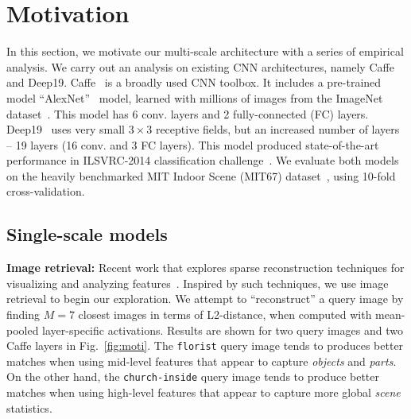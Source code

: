 \documentclass[10pt,twocolumn,letterpaper]{article}
\begin{document}


\section{Motivation\label{sec:motivation}}

In this section, we motivate our multi-scale architecture with a series of empirical analysis. We carry out an analysis on existing CNN architectures, namely Caffe and Deep19. Caffe~\cite{Caffe} is a broadly used CNN toolbox. It includes a pre-trained model ``AlexNet''~\cite{AlexNet} model, learned with millions of images from the ImageNet dataset~\cite{ImageNet}. This model has 6 conv. layers and 2 fully-connected (FC) layers. Deep19~\cite{veryDeep} uses very small $3\times 3$ receptive fields, but an increased number of layers -- 19 layers (16 conv. and 3 FC layers). This model produced state-of-the-art performance in ILSVRC-2014 classification challenge~\cite{ILSVRC14}. We evaluate both models on the heavily benchmarked MIT Indoor Scene (MIT67) dataset~\cite{MIT67}, using 10-fold cross-validation.

\subsection{Single-scale models} 

{\bf Image retrieval:} Recent work that explores sparse reconstruction techniques for visualizing and analyzing features~\cite{vondrick2013hoggles}. Inspired by such techniques, we use image retrieval to begin our exploration. We attempt to ``reconstruct'' a query image by finding $M=7$ closest images in terms of L2-distance, when computed with mean-pooled layer-specific activations. Results are shown for two query images and two Caffe layers in Fig.~\ref{fig:moti}. The {\tt florist} query image tends to produces better matches when using mid-level features that appear to capture \textit{objects} and \textit{parts}. On the other hand, the {\tt church-inside} query image tends to produce better matches when using high-level features that appear to capture more global \textit{scene} statistics.
\end{document}
